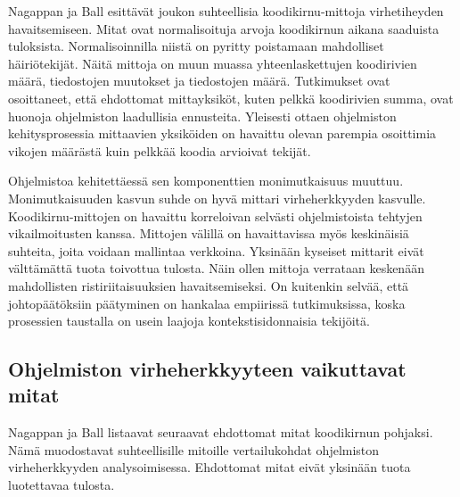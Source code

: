\documentclass[finnish]{../tktltiki2}
\theoremstyle{definition}
\theoremstyle{remark}
\begin{document}
    Nagappan ja Ball esittävät joukon suhteellisia koodikirnu-mittoja virhetiheyden havaitsemiseen. Mitat ovat 
normalisoituja arvoja koodikirnun aikana saaduista tuloksista. Normalisoinnilla niistä on pyritty poistamaan mahdolliset 
häiriötekijät. Näitä mittoja on muun muassa yhteenlaskettujen koodirivien määrä, tiedostojen muutokset ja tiedostojen 
määrä. Tutkimukset ovat osoittaneet, että ehdottomat mittayksiköt, kuten pelkkä koodirivien summa, ovat huonoja ohjelmiston 
laadullisia ennusteita. Yleisesti ottaen ohjelmiston kehitysprosessia mittaavien yksiköiden on havaittu olevan parempia
osoittimia vikojen määrästä kuin pelkkää koodia arvioivat tekijät.

    Ohjelmistoa kehitettäessä sen komponenttien monimutkaisuus muuttuu. Monimutkaisuuden kasvun suhde on hyvä mittari 
virheherkkyyden kasvulle. Koodikirnu-mittojen on havaittu korreloivan selvästi ohjelmistoista tehtyjen vikailmoitusten 
kanssa. Mittojen välillä on havaittavissa myös keskinäisiä suhteita, joita voidaan mallintaa verkkoina. Yksinään 
kyseiset mittarit eivät välttämättä tuota toivottua tulosta. Näin ollen mittoja verrataan keskenään mahdollisten 
ristiriitaisuuksien havaitsemiseksi. On kuitenkin selvää, että johtopäätöksiin päätyminen on hankalaa empiirissä 
tutkimuksissa, koska prosessien taustalla on usein laajoja kontekstisidonnaisia tekijöitä.

\subsection{Ohjelmiston virheherkkyyteen vaikuttavat mitat}

Nagappan ja Ball listaavat seuraavat ehdottomat mitat koodikirnun pohjaksi. Nämä muodostavat suhteellisille mitoille 
vertailukohdat ohjelmiston virheherkkyyden analysoimisessa. Ehdottomat mitat eivät yksinään tuota luotettavaa tulosta.
\end{document}
